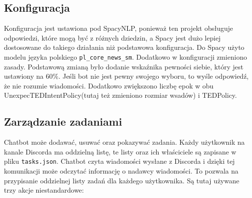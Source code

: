\documentclass{article}
\begin{document}
\subsection{Konfiguracja}
Konfiguracja jest ustawiona pod SpacyNLP, ponieważ ten projekt obsługuje
odpowiedzi, które mogą być z różnych dziedzin, a Spacy jest dużo lepiej
dostosowane do takiego działania niż podstawowa konfiguracja. Do Spacy użyto
modelu języka polskiego \verb|pl_core_news_sm|. Dodatkowo w konfiguracji
zmieniono zasady. Podstawową zmianą było dodanie wskaźnika pewności siebie,
który jest ustawiony na 60\%. Jeśli bot nie jest pewny swojego wyboru, to wyśle
odpowiedź, że nie rozumie wiadomości. Dodatkowo zwiększono liczbę epok w obu
UnexpecTEDIntentPolicy(tutaj też zmieniono rozmiar wsadów) i TEDPolicy.

\subsection{Zarządzanie zadaniami}
Chatbot może dodawać, usuwać oraz pokazywać zadania. Każdy użytkownik na kanale
Discorda ma oddzielną listę, te listy oraz ich właściciele są zapisane w pliku
\verb|tasks.json|. Chatbot czyta wiadomości wysłane z Discorda i dzięki tej
komunikacji może odczytać informację o nadawcy wiadomości. To pozwala na
przypisanie oddzielnej listy zadań dla każdego użytkownika. Są tutaj używane
trzy akcje niestandardowe:
\end{document}
